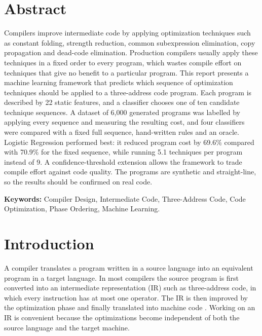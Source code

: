 \documentclass[12pt,a4paper]{article}
\begin{document}
\section*{Abstract}

Compilers improve intermediate code by applying optimization techniques such as constant folding, strength reduction, common subexpression elimination, copy propagation and dead-code elimination. Production compilers usually apply these techniques in a fixed order to every program, which wastes compile effort on techniques that give no benefit to a particular program. This report presents a machine learning framework that predicts which sequence of optimization techniques should be applied to a three-address code program. Each program is described by 22 static features, and a classifier chooses one of ten candidate technique sequences. A dataset of 6{,}000 generated programs was labelled by applying every sequence and measuring the resulting cost, and four classifiers were compared with a fixed full sequence, hand-written rules and an oracle. Logistic Regression performed best: it reduced program cost by 69.6\% compared with 70.9\% for the fixed sequence, while running 5.1 techniques per program instead of 9. A confidence-threshold extension allows the framework to trade compile effort against code quality. The programs are synthetic and straight-line, so the results should be confirmed on real code.

\vspace{0.3cm}
\textbf{Keywords:}
Compiler Design, Intermediate Code, Three-Address Code, Code Optimization,
Phase Ordering, Machine Learning.

\newpage

\section{Introduction}

A compiler translates a program written in a source language into an equivalent program in a target language. In most compilers the source program is first converted into an intermediate representation (IR) such as three-address code, in which every instruction has at most one operator. The IR is then improved by the optimization phase and finally translated into machine code \cite{aho2006,cooper2007}. Working on an IR is convenient because the optimizations become independent of both the source language and the target machine.
\end{document}
